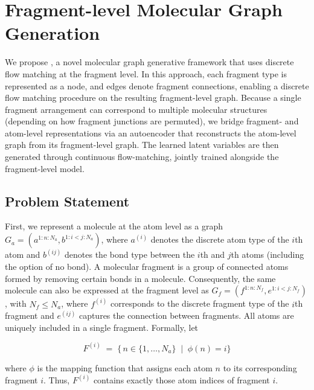 \section{Fragment-level Molecular Graph Generation}

We propose \methodname, a novel molecular graph generative framework that uses discrete flow matching at the fragment level. In this approach, each fragment type is represented as a node, and edges denote fragment connections, enabling a discrete flow matching procedure on the resulting fragment-level graph. Because a single fragment arrangement can correspond to multiple molecular structures (depending on how fragment junctions are permuted), we bridge fragment- and atom-level representations via an autoencoder that reconstructs the atom-level graph from its fragment-level graph. The learned latent variables are then generated through continuous flow-matching, jointly trained alongside the fragment-level model.

\subsection{Problem Statement} 
\label{sec:prob_state}

First, we represent a molecule at the atom level as a graph $G_a=(a^{1:n:N_{a}},b^{1:i<j:N_{a}})$, where $a^{(i)}$ denotes the discrete atom type of the $i$th atom and $b^{(ij)}$ denotes the bond type between the $i$th and $j$th atoms (including the option of no bond). A molecular fragment is a group of connected atoms formed by removing certain bonds in a molecule. Consequently, the same molecule can also be expressed at the fragment level as $G_f=(f^{1:n:N_{f}},e^{1:i<j:N_{f}})$, with $N_{f} \le N_{a}$, where $f^{(i)}$ corresponds to the discrete fragment type of the $i$th fragment and $e^{(ij)}$ captures the connection between fragments. All atoms are uniquely included in a single fragment. Formally, let 

    \begin{equation}
        F^{(i)} \;=\; \bigl\{\, n \in \{1,\dots,N_a\} \;\mid\; \phi(n) = i \bigr\}   
    \end{equation}

where $\phi$ is the mapping function that assigns each atom $n$ to its corresponding fragment $i$. Thus, $F^{(i)}$ contains exactly those atom indices of fragment $i$.


